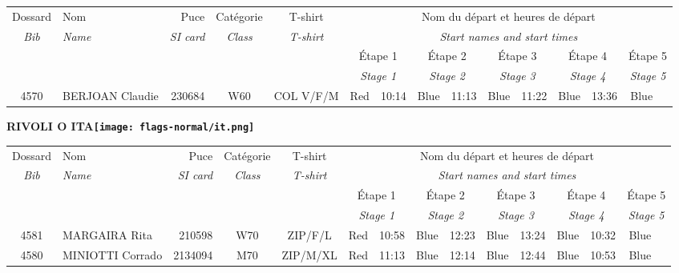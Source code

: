 \documentclass{report}
\begin{document}
  \begin{longtable}{|c|l|r|c|c|*{5}{cc|}}
    Dossard & Nom  & Puce    & Catégorie & T-shirt & \multicolumn{10}{c|}{Nom du départ et heures de départ} \\
    \itshape Bib     & \itshape Name & \itshape SI card & \itshape Class  & \itshape  T-shirt  & \multicolumn{10}{c|}{\itshape Start names and start times} \\
    \hline
    & & & & & \multicolumn{2}{c|}{Étape 1} & \multicolumn{2}{c|}{Étape 2} & \multicolumn{2}{c|}{Étape 3} & \multicolumn{2}{c|}{Étape 4} & \multicolumn{2}{c|}{Étape 5} \\
    & & & & & \multicolumn{2}{c|}{\itshape Stage 1} & \multicolumn{2}{c|}{\itshape Stage 2} & \multicolumn{2}{c|}{\itshape Stage 3} & \multicolumn{2}{c|}{\itshape Stage 4} & \multicolumn{2}{c|}{\itshape Stage 5} \\
    \hline
    4570 & BERJOAN Claudie & 230684 & W60 & COL V/F/M & Red & 10:14 & Blue & 11:13 & Blue & 11:22 & Blue & 13:36 & Blue &  \\
  \end{longtable}
\newpage
  \Huge \centering \bfseries RIVOLI O  ITA\normalfont \footnotesize \sffamily \hfill \texttt{[image: flags-normal/it.png]} \newline 
  \begin{longtable}{|c|l|r|c|c|*{5}{cc|}}
    Dossard & Nom  & Puce    & Catégorie & T-shirt & \multicolumn{10}{c|}{Nom du départ et heures de départ} \\
    \itshape Bib     & \itshape Name & \itshape SI card & \itshape Class  & \itshape  T-shirt  & \multicolumn{10}{c|}{\itshape Start names and start times} \\
    \hline
    & & & & & \multicolumn{2}{c|}{Étape 1} & \multicolumn{2}{c|}{Étape 2} & \multicolumn{2}{c|}{Étape 3} & \multicolumn{2}{c|}{Étape 4} & \multicolumn{2}{c|}{Étape 5} \\
    & & & & & \multicolumn{2}{c|}{\itshape Stage 1} & \multicolumn{2}{c|}{\itshape Stage 2} & \multicolumn{2}{c|}{\itshape Stage 3} & \multicolumn{2}{c|}{\itshape Stage 4} & \multicolumn{2}{c|}{\itshape Stage 5} \\
    \hline
    4581 & MARGAIRA Rita & 210598 & W70 & ZIP/F/L & Red & 10:58 & Blue & 12:23 & Blue & 13:24 & Blue & 10:32 & Blue &  \\
    4580 & MINIOTTI Corrado & 2134094 & M70 & ZIP/M/XL & Red & 11:13 & Blue & 12:14 & Blue & 12:44 & Blue & 10:53 & Blue &  \\
  \end{longtable}
\end{document}
